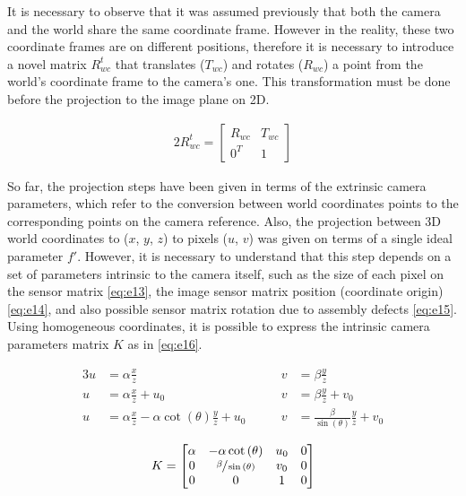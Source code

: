 \documentclass{article}
\begin{document}
It is necessary to observe that it was assumed previously that both the camera and the world share the same coordinate frame. However in the reality, these two coordinate frames are on different positions, therefore it is necessary to introduce a novel matrix $R^t_{wc}$ that translates ($T_{wc}$) and rotates ($R_{wc}$) a point from the world's coordinate frame to the camera's one. This transformation must be done before the projection to the image plane on 2D.


\begin{alignat}{2}
R^t_{wc} =
\begin{bmatrix}
R_{wc} & T_{wc} \\
0^{T} & 1
\end{bmatrix}
\end{alignat}


So far, the projection steps have been given in terms of the extrinsic camera parameters, which refer to the conversion between world coordinates points to the corresponding points on the camera reference. Also, the projection between 3D world coordinates to ($x$, $y$, $z$) to pixels ($u$, $v$) was given on terms of a single ideal parameter $f'$. However, it is necessary to understand that this step depends on a set of parameters intrinsic to the camera itself, such as the size of each pixel on the sensor matrix \eqref{eq:e13}, the image sensor matrix position (coordinate origin) \eqref{eq:e14}, and also possible sensor matrix rotation due to assembly defects \eqref{eq:e15}. Using homogeneous coordinates, it is possible to express the intrinsic camera parameters matrix $K$ as in \eqref{eq:e16}.

\begin{alignat}{3}
u &= \alpha \frac{x}{z} &\qquad v &= \beta \frac{y}{z} \label{eq:e13} \\ 
u &= \alpha \frac{x}{z} + u_0 &\qquad v &= \beta \frac{y}{z} + v_0 \label{eq:e14} \\
u &= \alpha \frac{x}{z} - \alpha \cot{(\theta)} \frac{y}{z}  + u_0 &\qquad v &= \frac{\beta}{\sin{(\theta)}} \frac{y}{z} + v_0 \label{eq:e15}
\end{alignat}


\begin{alignat}{3}
K = \begin{bmatrix}
\alpha & -\alpha \cot{(\theta)} & u_0 & 0   \\
0 & \sfrac{\beta}{\sin{(\theta)}} & v_0 & 0  \\
0 & 0 & 1 & 0
\end{bmatrix} \label{eq:e16}
\end{alignat}
\end{document}
